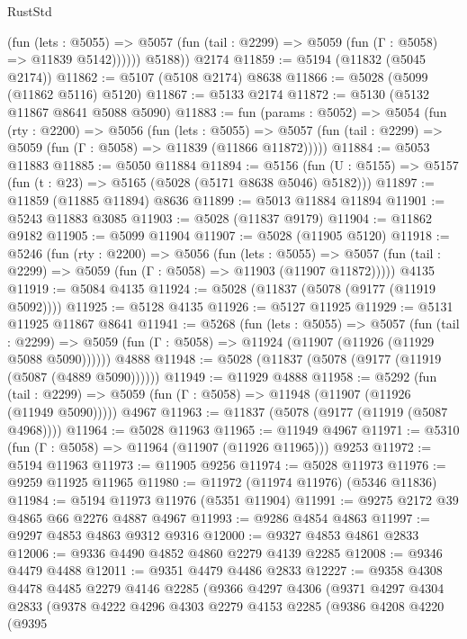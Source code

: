 \begin{lexlean}{RustStd}
\begin{coremodule}
              (fun (lets : @5055) =>
              @5057 (fun (tail : @2299) => @5059 (fun (Γ : @5058) => @11839 @5142))))))
        @5188))
    @2174
@11859 := @5194 (@11832 (@5045 @2174))
@11862 := @5107 (@5108 @2174) @8638
@11866 := @5028 (@5099 (@11862 @5116) @5120)
@11867 := @5133 @2174
@11872 := @5130 (@5132 @11867 @8641 @5088 @5090)
@11883 := fun (params : @5052) =>
  @5054
    (fun (rty : @2200) =>
    @5056
      (fun (lets : @5055) =>
      @5057 (fun (tail : @2299) => @5059 (fun (Γ : @5058) => @11839 (@11866 @11872)))))
@11884 := @5053 @11883
@11885 := @5050 @11884
@11894 := @5156
    (fun (U : @5155) => @5157 (fun (t : @23) => @5165 (@5028 (@5171 @8638 @5046) @5182)))
@11897 := @11859 (@11885 @11894) @8636
@11899 := @5013 @11884 @11894
@11901 := @5243 @11883 @3085
@11903 := @5028 (@11837 @9179)
@11904 := @11862 @9182
@11905 := @5099 @11904
@11907 := @5028 (@11905 @5120)
@11918 := @5246
    (fun (rty : @2200) =>
    @5056
      (fun (lets : @5055) =>
      @5057 (fun (tail : @2299) => @5059 (fun (Γ : @5058) => @11903 (@11907 @11872)))))
    @4135
@11919 := @5084 @4135
@11924 := @5028 (@11837 (@5078 (@9177 (@11919 @5092))))
@11925 := @5128 @4135
@11926 := @5127 @11925
@11929 := @5131 @11925 @11867 @8641
@11941 := @5268
    (fun (lets : @5055) =>
    @5057
      (fun (tail : @2299) =>
      @5059 (fun (Γ : @5058) => @11924 (@11907 (@11926 (@11929 @5088 @5090))))))
    @4888
@11948 := @5028 (@11837 (@5078 (@9177 (@11919 (@5087 (@4889 @5090))))))
@11949 := @11929 @4888
@11958 := @5292
    (fun (tail : @2299) => @5059 (fun (Γ : @5058) => @11948 (@11907 (@11926 (@11949 @5090)))))
    @4967
@11963 := @11837 (@5078 (@9177 (@11919 (@5087 @4968))))
@11964 := @5028 @11963
@11965 := @11949 @4967
@11971 := @5310 (fun (Γ : @5058) => @11964 (@11907 (@11926 @11965))) @9253
@11972 := @5194 @11963
@11973 := @11905 @9256
@11974 := @5028 @11973
@11976 := @9259 @11925 @11965
@11980 := @11972 (@11974 @11976) (@5346 @11836)
@11984 := @5194 @11973 @11976 (@5351 @11904)
@11991 := @9275 @2172 @39 @4865 @66 @2276 @4887 @4967
@11993 := @9286 @4854 @4863
@11997 := @9297 @4853 @4863 @9312 @9316
@12000 := @9327 @4853 @4861 @2833
@12006 := @9336 @4490 @4852 @4860 @2279 @4139 @2285
@12008 := @9346 @4479 @4488
@12011 := @9351 @4479 @4486 @2833
@12227 := @9358
    @4308
    @4478
    @4485
    @2279
    @4146
    @2285
    (@9366
      @4297
      @4306
      (@9371
        @4297
        @4304
        @2833
        (@9378
          @4222
          @4296
          @4303
          @2279
          @4153
          @2285
          (@9386
            @4208
            @4220
            (@9395

\end{coremodule}
\end{lexlean}
